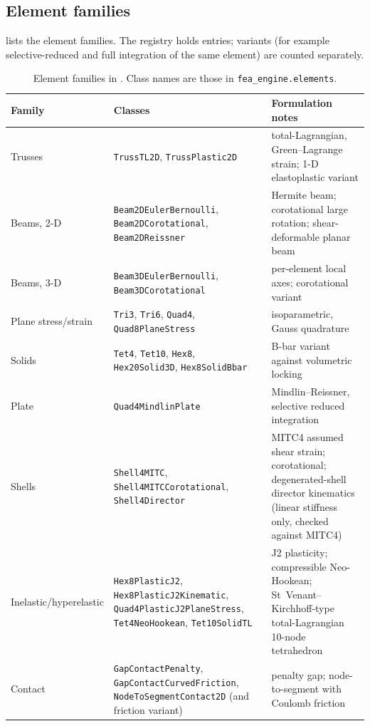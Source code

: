 \subsection{Element families}
 lists the element families. The registry holds \nElements{} entries; variants (for example selective-reduced and full integration of the same element) are
counted separately.

\begin{table}[t]
\centering\footnotesize
\caption{Element families in \fea{}. Class names are those in \texttt{fea\_engine.elements}.}
\label{tab:elements}
\begin{tabular}{>{\raggedright\arraybackslash}p{3.0cm}>{\raggedright\arraybackslash}p{5.2cm}>{\raggedright\arraybackslash}p{5.2cm}}
\toprule
Family & Classes & Formulation notes \\
\midrule
Trusses & \texttt{TrussTL2D}, \texttt{TrussPlastic2D} & total-Lagrangian, Green--Lagrange strain; 1-D elastoplastic variant \\
Beams, 2-D & \texttt{Beam2DEulerBernoulli}, \texttt{Beam2DCorotational}, \texttt{Beam2DReissner} & Hermite beam; corotational large rotation; shear-deformable planar beam \\
Beams, 3-D & \texttt{Beam3DEulerBernoulli}, \texttt{Beam3DCorotational} & per-element local axes; corotational variant \\
Plane stress/strain & \texttt{Tri3}, \texttt{Tri6}, \texttt{Quad4}, \texttt{Quad8}\texttt{PlaneStress} & isoparametric, Gauss quadrature \\
Solids & \texttt{Tet4}, \texttt{Tet10}, \texttt{Hex8}, \texttt{Hex20}\texttt{Solid3D}, \texttt{Hex8SolidBbar} & B-bar variant against volumetric locking \\
Plate & \texttt{Quad4MindlinPlate} & Mindlin--Reissner, selective reduced integration \\
Shells & \texttt{Shell4MITC}, \texttt{Shell4MITCCorotational}, \texttt{Shell4Director} & MITC4 assumed shear strain; corotational; degenerated-shell director kinematics (linear stiffness only, checked against MITC4) \\
Inelastic/hyperelastic & \texttt{Hex8PlasticJ2}, \texttt{Hex8PlasticJ2Kinematic}, \texttt{Quad4PlasticJ2PlaneStress}, \texttt{Tet4NeoHookean}, \texttt{Tet10SolidTL} & J2 plasticity; compressible Neo-Hookean; St~Venant--Kirchhoff-type total-Lagrangian 10-node tetrahedron \\
Contact & \texttt{GapContactPenalty}, \texttt{GapContactCurvedFriction}, \texttt{NodeToSegment\allowbreak Contact2D} (and friction variant) & penalty gap; node-to-segment with Coulomb friction \\
\bottomrule
\end{tabular}
\end{table}

